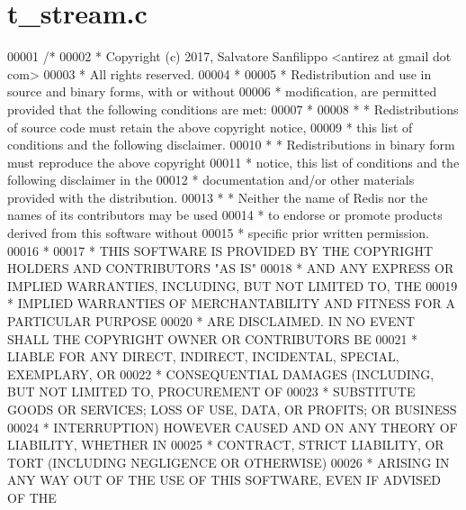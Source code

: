 \hypertarget{t__stream_8c_source}{}\section{t\+\_\+stream.\+c}
\label{t__stream_8c_source}

\begin{DoxyCode}
00001 \textcolor{comment}{/*}
00002 \textcolor{comment}{ * Copyright (c) 2017, Salvatore Sanfilippo <antirez at gmail dot com>}
00003 \textcolor{comment}{ * All rights reserved.}
00004 \textcolor{comment}{ *}
00005 \textcolor{comment}{ * Redistribution and use in source and binary forms, with or without}
00006 \textcolor{comment}{ * modification, are permitted provided that the following conditions are met:}
00007 \textcolor{comment}{ *}
00008 \textcolor{comment}{ *   * Redistributions of source code must retain the above copyright notice,}
00009 \textcolor{comment}{ *     this list of conditions and the following disclaimer.}
00010 \textcolor{comment}{ *   * Redistributions in binary form must reproduce the above copyright}
00011 \textcolor{comment}{ *     notice, this list of conditions and the following disclaimer in the}
00012 \textcolor{comment}{ *     documentation and/or other materials provided with the distribution.}
00013 \textcolor{comment}{ *   * Neither the name of Redis nor the names of its contributors may be used}
00014 \textcolor{comment}{ *     to endorse or promote products derived from this software without}
00015 \textcolor{comment}{ *     specific prior written permission.}
00016 \textcolor{comment}{ *}
00017 \textcolor{comment}{ * THIS SOFTWARE IS PROVIDED BY THE COPYRIGHT HOLDERS AND CONTRIBUTORS "AS IS"}
00018 \textcolor{comment}{ * AND ANY EXPRESS OR IMPLIED WARRANTIES, INCLUDING, BUT NOT LIMITED TO, THE}
00019 \textcolor{comment}{ * IMPLIED WARRANTIES OF MERCHANTABILITY AND FITNESS FOR A PARTICULAR PURPOSE}
00020 \textcolor{comment}{ * ARE DISCLAIMED. IN NO EVENT SHALL THE COPYRIGHT OWNER OR CONTRIBUTORS BE}
00021 \textcolor{comment}{ * LIABLE FOR ANY DIRECT, INDIRECT, INCIDENTAL, SPECIAL, EXEMPLARY, OR}
00022 \textcolor{comment}{ * CONSEQUENTIAL DAMAGES (INCLUDING, BUT NOT LIMITED TO, PROCUREMENT OF}
00023 \textcolor{comment}{ * SUBSTITUTE GOODS OR SERVICES; LOSS OF USE, DATA, OR PROFITS; OR BUSINESS}
00024 \textcolor{comment}{ * INTERRUPTION) HOWEVER CAUSED AND ON ANY THEORY OF LIABILITY, WHETHER IN}
00025 \textcolor{comment}{ * CONTRACT, STRICT LIABILITY, OR TORT (INCLUDING NEGLIGENCE OR OTHERWISE)}
00026 \textcolor{comment}{ * ARISING IN ANY WAY OUT OF THE USE OF THIS SOFTWARE, EVEN IF ADVISED OF THE}

\end{DoxyCode}
